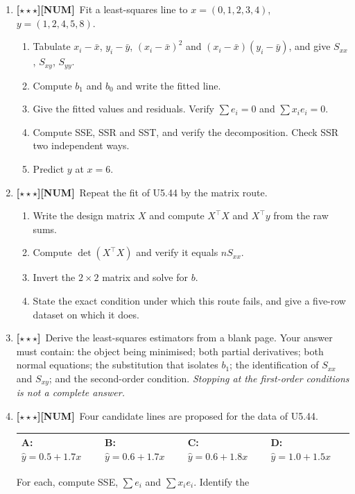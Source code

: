 \documentclass[11pt,a4paper]{article}
\newcommand{\LA}{{\footnotesize\textbf{[$\star\star\star$]}}}
\newcommand{\NUM}{{\footnotesize\textbf{[NUM]}}}
\newcommand{\Q}[1]{\item[\textbf{#1}]}
\begin{document}
\begin{enumerate}[leftmargin=2.2cm]

\Q{U5.44}\LA\NUM\ Fit a least-squares line to
  $x = (0, 1, 2, 3, 4)$, $y = (1, 2, 4, 5, 8)$.
  \begin{enumerate}[label=(\alph*)]
    \item Tabulate $x_i - \bar x$, $y_i - \bar y$, $(x_i-\bar x)^2$ and
      $(x_i-\bar x)(y_i-\bar y)$, and give $S_{xx}$, $S_{xy}$, $S_{yy}$.
    \item Compute $b_1$ and $b_0$ and write the fitted line.
    \item Give the fitted values and residuals. Verify $\sum e_i = 0$ and
      $\sum x_i e_i = 0$.
    \item Compute SSE, SSR and SST, and verify the decomposition. Check SSR
      two independent ways.
    \item Predict $y$ at $x = 6$.
  \end{enumerate}
\Q{U5.45}\LA\NUM\ Repeat the fit of U5.44 by the matrix route.
  \begin{enumerate}[label=(\alph*)]
    \item Write the design matrix $X$ and compute $X^\top X$ and $X^\top y$
      from the raw sums.
    \item Compute $\det(X^\top X)$ and verify it equals $n S_{xx}$.
    \item Invert the $2\times2$ matrix and solve for $b$.
    \item State the exact condition under which this route fails, and give a
      five-row dataset on which it does.
  \end{enumerate}
\Q{U5.46}\LA\ Derive the least-squares estimators from a blank page. Your
  answer must contain: the object being minimised; both partial derivatives;
  both normal equations; the substitution that isolates $b_1$; the
  identification of $S_{xx}$ and $S_{xy}$; and the second-order condition.
  \emph{Stopping at the first-order conditions is not a complete answer.}
\Q{U5.47}\LA\NUM\ Four candidate lines are proposed for the data of U5.44.
  \begin{center}\begin{tabular}{@{}llll@{}}\toprule
  A: $\hat y = 0.5 + 1.7x$ & B: $\hat y = 0.6 + 1.7x$ &
  C: $\hat y = 0.6 + 1.8x$ & D: $\hat y = 1.0 + 1.5x$\\
  \bottomrule\end{tabular}\end{center}
  For each, compute SSE, $\sum e_i$ and $\sum x_ie_i$. Identify the

\end{enumerate}
\end{document}
